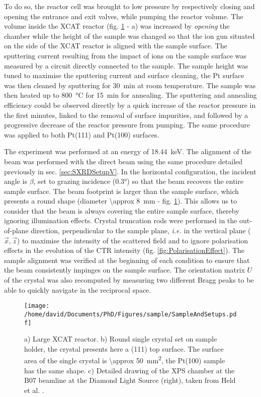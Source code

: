 To do so, the reactor cell was brought to low pressure by respectively closing and opening the entrance and exit valves, while pumping the reactor volume.
The volume inside the XCAT reactor (fig. \ref{fig:SampleSXRD} - a) was increased by \textit{opening} the chamber while the height of the sample was changed so that the ion gun situated on the side of the XCAT reactor is aligned with the sample surface.
The sputtering current resulting from the impact of ions on the sample surface was measured by a circuit directly connected to the sample.
The sample height was tuned to maximise the sputtering current and surface cleaning, the Pt surface was then cleaned by sputtering for \qty{30}{\minute} at room temperature.
The sample was then heated up to \qty{800}{\degreeCelsius} for \qty{15}{\minute} for annealing.
The sputtering and annealing efficiency could be observed directly by a quick increase of the reactor pressure in the first minutes, linked to the removal of surface impurities, and followed by a progressive decrease of the reactor pressure from pumping.
The same procedure was applied to both Pt(111) and Pt(100) surfaces.

The experiment was performed at an energy of \qty{18.44}{\keV}.
The alignment of the beam was performed with the direct beam using the same procedure detailed previously in sec. \ref{sec:SXRDSetupV}.
In the horizontal configuration, the incident angle is $\beta$, set to grazing incidence (\ang{0.3}) so that the beam recovers the entire sample surface.
The beam footprint is larger than the sample surface, which presents a round shape (diameter \qty{\approx 8}{\mm} - fig. \ref{fig:SampleSXRD}).
This allows us to consider that the beam is always covering the entire sample surface, thereby ignoring illumination effects.
Crystal truncation rods were performed in the out-of-plane direction, perpendicular to the sample plane, \textit{i.e.} in the vertical plane ($\vec{x}, \vec{z}$) to maximise the intensity of the scattered field and to ignore polarisation effects in the evolution of the CTR intensity (fig. \ref{fig:PolarisationEffect}).
The sample alignment was verified at the beginning of each condition to ensure that the beam consistently impinges on the sample surface.
The orientation matrix $U$ of the crystal \parencite{Schleputz2011} was also recomputed by measuring two different Bragg peaks to be able to quickly navigate in the reciprocal space.

\begin{figure}[!htb]
    \centering
    \texttt{[image: /home/david/Documents/PhD/Figures/sample/SampleAndSetups.pdf]}
    \caption{
        a) Large XCAT reactor.
        b) Round single crystal set on sample holder, the crystal presents here a (111) top surface.
        The surface area of the single crystal is \qty{\approx 50}{\mm^2}, the Pt(100) sample has the same shape.
        c) Detailed drawing of the XPS chamber at the B07 beamline at the Diamond Light Source (right), taken from Held et al. \parencite*{Held2020}.
    }
    \label{fig:SampleSXRD}
\end{figure}

